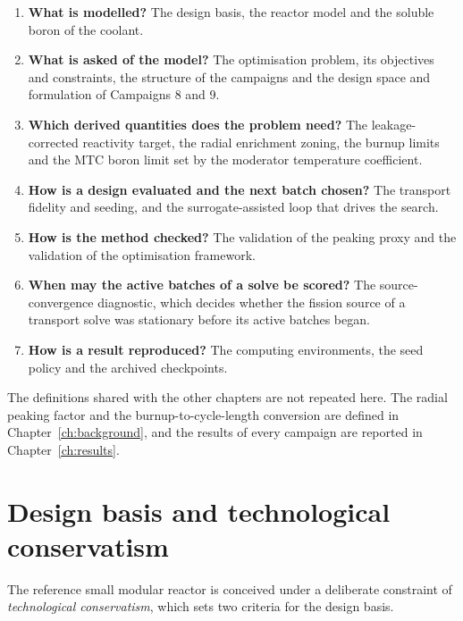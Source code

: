 \begin{enumerate}
  \item \textbf{What is modelled?} The design basis, the reactor model
        and the soluble boron of the coolant.

  \item \textbf{What is asked of the model?} The optimisation problem,
        its objectives and constraints, the structure of the campaigns
        and the design space and formulation of Campaigns 8 and 9.

  \item \textbf{Which derived quantities does the problem need?} The
        leakage-corrected reactivity target, the radial enrichment
        zoning, the burnup limits and the MTC boron limit set by
        the moderator temperature coefficient.

  \item \textbf{How is a design evaluated and the next batch
        chosen?} The transport fidelity and seeding, and the
        surrogate-assisted loop that drives the search.

  \item \textbf{How is the method checked?} The validation of the
        peaking proxy and the validation of the optimisation framework.

  \item \textbf{When may the active batches of a solve be scored?}
        The source-convergence diagnostic, which decides whether the
        fission source of a transport solve was stationary before its
        active batches began.

  \item \textbf{How is a result reproduced?} The computing
        environments, the seed policy and the archived checkpoints.
\end{enumerate}

The definitions shared with the other chapters are not repeated here.
The radial peaking factor and the burnup-to-cycle-length conversion are
defined in Chapter~\ref{ch:background}, and the results of every
campaign are reported in Chapter~\ref{ch:results}.

\section{Design basis and technological conservatism}
\label{sec:design-basis}

The reference small modular reactor is conceived under a deliberate
constraint of \emph{technological conservatism}, which sets two criteria
for the design basis.

